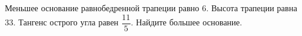 \begin{ex}
	\begin{condition}
		 Меньшее основание равнобедренной трапеции равно \( 6 \). Высота трапеции равна \( 33 \). Тангенс острого угла равен \( \dfrac{11}{5}\).  Найдите большее основание.
	\end{condition}
\end{ex}